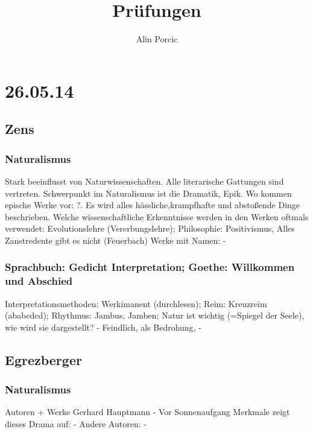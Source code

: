 \documentclass[a4paper]{article}
\title{Prüfungen}
\author{Alin Porcic}
\begin{document}
\maketitle
\newpage

\section{26.05.14}

\subsection{Zens}

\subsubsection{Naturalismus}

Stark beeinflusst von Naturwissenschaften. Alle literarische Gattungen sind vertreten. Schwerpunkt im Naturalismus ist die Dramatik, Epik. Wo kommen epische Werke vor: ?. Es wird alles hässliche,krampfhafte und abstoßende Dinge  beschrieben. Welche wissenschaftliche Erkenntnisse werden in den Werken oftmals verwendet: Evolutionslehre (Vererbungslehre);
Philosophie: Positivismus, Alles Zanstredente gibt es nicht (Feuerbach)
\newline
Werke mit Namen: -

\subsubsection{Sprachbuch: Gedicht Interpretation; Goethe: Willkommen und Abschied}

Interpretationsmethoden: Werkimanent (durchlesen); Reim: Kreuzreim (ababcdcd); Rhythmus: Jambus, Jamben; Natur ist wichtig (=Spiegel der Seele), wie wird sie dargestellt? - Feindlich, als Bedrohung, -

\subsection{Egrezberger}

\subsubsection{Naturalismus}

Autoren + Werke
\newline
Gerhard Hauptmann - Vor Sonnenaufgang
\newline
Merkmale zeigt dieses Drama auf:
-
\newline
Andere Autoren: -
\end{document}
